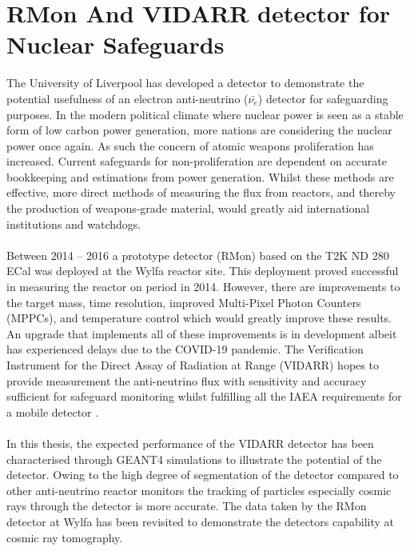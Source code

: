 \section{RMon And VIDARR detector for Nuclear Safeguards}
The University of Liverpool has developed a detector to demonstrate the potential usefulness of an electron anti-neutrino ($\bar{\nu_e}$) detector for safeguarding purposes. In the modern political climate where nuclear power is seen as a stable form of low carbon power generation, more nations are considering the nuclear power once again. As such the concern of atomic weapons proliferation has increased. Current safeguards for non-proliferation are dependent on accurate bookkeeping and estimations from power generation. Whilst these methods are effective, more direct methods of measuring the flux from reactors, and thereby the production of weapons-grade material, would greatly aid international institutions and watchdogs.
\\\\Between 2014 -- 2016 a prototype detector (RMon) based on the T2K ND 280 ECal \cite{Allan_2013} was deployed at the Wylfa reactor site. This deployment proved successful in measuring the reactor on period in 2014. However, there are improvements to the target mass, time resolution, improved Multi-Pixel Photon Counters (MPPCs), and temperature control which would greatly improve these results. An upgrade that implements all of these improvements is in development albeit has experienced delays due to the COVID-19 pandemic. The Verification Instrument for the Direct Assay of Radiation at Range (VIDARR) hopes to provide measurement the anti-neutrino flux with sensitivity and accuracy sufficient for safeguard monitoring whilst fulfilling all the IAEA requirements for a mobile detector \cite{IAEA_2008}.
\\\\In this thesis, the expected performance of the VIDARR detector has been characterised through GEANT4 \cite{Agostinelli:2002hh} simulations to illustrate the potential of the detector. Owing to the high degree of segmentation of the detector compared to other anti-neutrino reactor monitors the tracking of particles especially cosmic rays through the detector is more accurate. The data taken by the RMon detector at Wylfa has been revisited to demonstrate the detectors capability at cosmic ray tomography.

